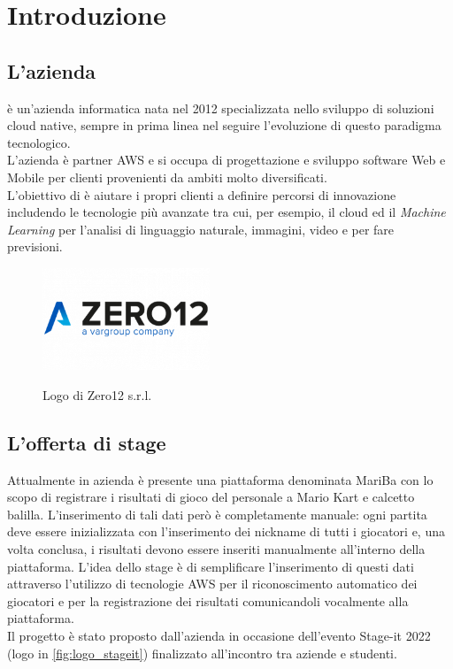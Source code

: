 
\chapter{Introduzione}
\label{cap:introduzione}

\section{L'azienda}

\azienda è un'azienda informatica nata nel 2012 specializzata nello sviluppo di soluzioni cloud native, sempre in prima linea nel seguire l'evoluzione di questo paradigma tecnologico. \\
L'azienda è partner \gls{AWS} e si occupa di progettazione e sviluppo software Web e Mobile per clienti provenienti da ambiti molto diversificati. \\
L'obiettivo di \azienda è aiutare i propri clienti a definire percorsi di innovazione includendo le tecnologie più avanzate tra cui, per esempio,
il cloud ed il \emph{Machine Learning} per l'analisi di linguaggio naturale, immagini, video e per fare previsioni. 

	\begin{figure}[H]
		\centering
		\includegraphics[width=5cm]{immagini/logo-zero12.png} \\
		\caption{\label{fig:logo_zero12} Logo di Zero12 s.r.l.}
	\end{figure}

\section{L'offerta di stage}
	Attualmente in azienda è presente una piattaforma denominata MariBa con lo scopo di registrare i risultati di gioco del personale a Mario Kart e calcetto balilla. L'inserimento di tali dati però è completamente manuale: ogni partita deve essere
	inizializzata con l'inserimento dei nickname di tutti i giocatori e, una volta conclusa, i risultati devono
	essere inseriti manualmente all'interno della piattaforma. L'idea dello stage è di semplificare l'inserimento di questi
	dati attraverso l'utilizzo di tecnologie \gls{AWS} per il riconoscimento automatico dei giocatori e per la registrazione dei risultati comunicandoli vocalmente alla piattaforma. \\
	Il progetto è stato proposto dall'azienda in occasione dell'evento Stage-it 2022 (logo in \autoref{fig:logo_stageit}) finalizzato all'incontro tra aziende e studenti.
	
